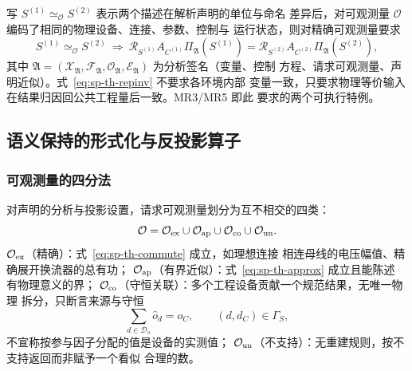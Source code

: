 \begin{definition}[表示不变性]\label{def:sp-th-repinv}
写 $S^{(1)}\simeq_{\mathcal O}S^{(2)}$ 表示两个描述在解析声明的单位与命名
差异后，对可观测量 $\mathcal O$ 编码了相同的物理设备、连接、参数、控制与
运行状态，则对精确可观测量要求
\begin{equation}
S^{(1)}\simeq_{\mathcal O}S^{(2)}
\ \Longrightarrow\
\mathcal R_{S^{(1)}}A_{C^{(1)}}\Pi_{\mathfrak A}\!\left(S^{(1)}\right)
=
\mathcal R_{S^{(2)}}A_{C^{(2)}}\Pi_{\mathfrak A}\!\left(S^{(2)}\right),
\label{eq:sp-th-repinv}
\end{equation}
其中 $\mathfrak A=(\mathcal X_{\mathfrak A},\mathcal F_{\mathfrak A},
\mathcal O_{\mathfrak A},\mathcal E_{\mathfrak A})$ 为分析签名（变量、控制
方程、请求可观测量、声明近似）。式~\eqref{eq:sp-th-repinv} 不要求各环境内部
变量一致，只要求物理等价输入在结果归因回公共工程量后一致。MR3/MR5 即此
要求的两个可执行特例。
\end{definition}

\subsection{语义保持的形式化与反投影算子}\label{sec:sp-th-preservation}

\subsubsection{可观测量的四分法}
\begin{definition}[可观测量划分]\label{def:sp-th-partition}
对声明的分析与投影设置，请求可观测量划分为互不相交的四类：
\begin{equation}
\mathcal O=\mathcal O_{\rm ex}\cup\mathcal O_{\rm ap}
\cup\mathcal O_{\rm co}\cup\mathcal O_{\rm un}.
\end{equation}
$\mathcal O_{\rm ex}$（精确）：式~\eqref{eq:sp-th-commute} 成立，如理想连接
相连母线的电压幅值、精确展开换流器的总有功；
$\mathcal O_{\rm ap}$（有界近似）：式~\eqref{eq:sp-th-approx} 成立且能陈述
有物理意义的界；
$\mathcal O_{\rm co}$（守恒关联）：多个工程设备贡献一个规范结果，无唯一物理
拆分，只断言来源与守恒
\begin{equation}
\sum_{d\in\mathcal D_o}\widehat{o}_d=o_C,
\qquad (d,d_C)\in\Gamma_S,
\label{eq:sp-th-conservation}
\end{equation}
不宣称按参与因子分配的值是设备的实测值；
$\mathcal O_{\rm un}$（不支持）：无重建规则，按不支持返回而非赋予一个看似
合理的数。
\end{definition}

